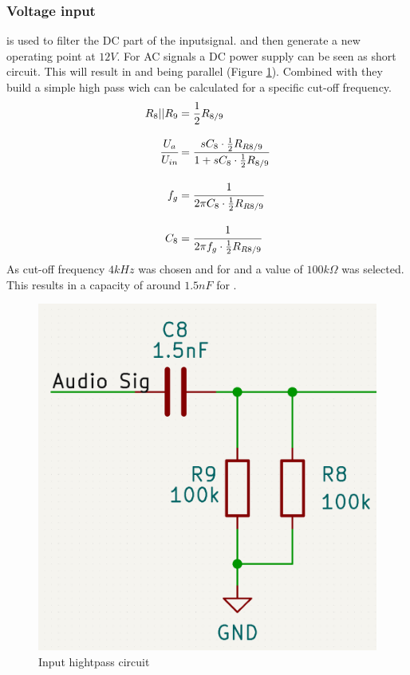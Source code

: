 \subsubsection*{Voltage input}
%
 is used to filter the DC part of the inputsignal.  and  then generate a new operating point at $12V$. For AC signals a DC power supply can be seen as short circuit. This will result in  and  being parallel (Figure \ref{fig:pcb:amp_hp}). Combined with  they build a simple high pass wich can be calculated for a specific cut-off frequency.
%
\begin{align}
  R_8 || R_9 &= \frac{1}{2} R_{8/9} \pmath
  \cfrac{U_a}{U_{in}} &= \cfrac{sC_8\cdot \frac{1}{2}R_{R8/9}}{1 + sC_8\cdot \frac{1}{2}R_{8/9}} \pmath
  f_g &= \cfrac{1}{2 \pi C_8 \cdot \frac{1}{2}R_{R8/9}} \pmath
  C_8 &= \cfrac{1}{2 \pi f_g \cdot \frac{1}{2}R_{R8/9}}
\end{align}
%
As cut-off frequency $4kHz$ was chosen and for  and  a value of $100k\Omega$ was selected. This results in a capacity of around $1.5nF$ for .
%
\begin{figure}
  \centering
  \includegraphics[height=\smallheight]{src/assets/pictures/circuit/amp_hp_circuit.png}
  \caption{Input hightpass circuit}\label{fig:pcb:amp_hp}
\end{figure}
%
